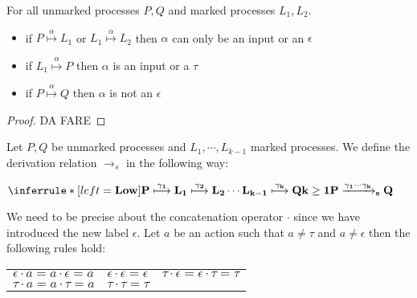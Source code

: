 


\begin{lemma}\label{lemmacom3}
  For all unmarked processes $P,Q$ and marked processes $L_{1}, L_{2}$.
  \begin{itemize}
    \item
      if $P\stackrel{\alpha}{\longmapsto}L_{1}$ or $L_{1}\stackrel{\alpha}{\longmapsto}L_{2}$ then $\alpha$ can only be an input or an $\epsilon$
    \item
      if $L_{1}\stackrel{\alpha}{\longmapsto}P$ then $\alpha$ is an input or a $\tau$
    \item
      if $P\stackrel{\alpha}{\longmapsto}Q$ then $\alpha$ is not an $\epsilon$
  \end{itemize}
  \begin{proof}
    DA FARE
  \end{proof}
\end{lemma}


  
\begin{definition}\label{low}
  Let $P, Q$ be unmarked processes and $L_{1}, \cdots, L_{k-1}$ marked processes. We define the derivation relation $\rightarrow_{s}$ in the following way:
  \begin{center}
    $\inferrule* [left=\bf{Low}]{
	P \stackrel{\gamma_{1}}{\longmapsto} L_{1} \stackrel{\gamma_{2}}{\longmapsto} L_{2} \cdots L_{k-1} \stackrel{\gamma_{k}}{\longmapsto} Q
      \\
	k\geq 1
    }{
      P \xrightarrow{\gamma_{1} \cdots \gamma_{k}}_{s}  Q
    }$
  \end{center}
  We need to be precise about the concatenation operator $\cdot$ since we have introduced the new label $\epsilon$. Let $a$ be an action such that $a\neq \tau$ and $a\neq \epsilon$ then the following rules hold:
  \begin{center}
      \begin{tabular}{lll}
	  $\epsilon \cdot a = a \cdot \epsilon = a$
	&
	  $\epsilon \cdot \epsilon = \epsilon$
	&
	  $\tau \cdot \epsilon = \epsilon \cdot \tau = \tau$
	\\
	  $\tau \cdot a = a \cdot \tau = a$
	&
	  $\tau \cdot \tau = \tau$
	&
      \end{tabular}
  \end{center}
\end{definition}

